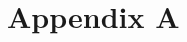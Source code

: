 \documentclass[11pt]{article}
\renewcommand{\P}{\mathbb{P}}
\theoremstyle{definition}
\theoremstyle{definition}
\def\one{{\bf 1}}
\def\F{{\cal F}}
\def\P{{\mathbb P}}
\begin{document}
\section{Appendix A}
%
%
%
\end{document}
